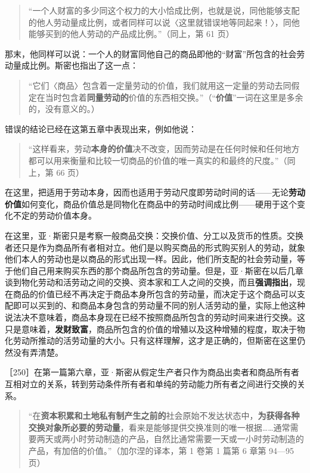\begin{quote}“一个人财富的多少同这个权力的大小恰成比例，也就是说，同他能够支配的他人劳动量成比例，或者同样可以说〈这里就错误地等同起来！〉，同他能够买到的他人劳动的产品成比例。”（同上，第 61 页）\end{quote}

那末，他同样可以说：一个人的财富同他自己的商品即他的“财富”所包含的社会劳动量成比例。斯密也指出了这一点：

\begin{quote}“它们〈商品〉包含着一定量劳动的价值，我们就用这一定量的劳动去同假定在当时包含着\textbf{同量劳动的}价值的东西相交换。”（“\textbf{价值}”一词在这里是多余的，没有意义的。）\end{quote}

错误的结论已经在这第五章中表现出来，例如他说：

\begin{quote}“这样看来，劳动\textbf{本身的价值}决不改变，因而劳动是在任何时候和任何地方都可以用来衡量和比较一切商品的价值的唯一真实的和最终的尺度。”（同上，第 66 页）\end{quote}

在这里，把适用于劳动本身，因而也适用于劳动尺度即劳动时间的话——无论\textbf{劳动价值}如何变化，商品价值总是同物化在商品中的劳动时间成比例——硬用于这个变化不定的劳动价值本身。

在这里，亚·斯密只是考察一般商品交换：交换价值、分工以及货币的性质。交换者还只是作为商品所有者相对立。他们是以购买商品的形式购买别人的劳动，就象他们本人的劳动也是以商品的形式出现一样。因此，他们所支配的社会劳动量，等于他们自己用来购买东西的那个商品所包含的劳动量。但是，亚·斯密在以后几章谈到物化劳动和活劳动之间的交换、资本家和工人之间的交换，而且\textbf{强调指出}，现在商品的价值已经不再决定于商品本身所包含的劳动量，而决定于这个商品可以支配即可以买到的、和商品本身包含的劳动量不同的别人活劳动的量，实际上他这种说法决不意味着，商品本身现在已经不按照商品所包含的劳动时间来进行交换。这只是意味着，\textbf{发财致富}，商品所包含的价值的增殖以及这种增殖的程度，取决于物化劳动所推动的活劳动量的大小。只有这样理解，这才是正确的，但斯密在这里仍然没有弄清楚。


［250］在第一篇第六章，亚·斯密从假定生产者只作为商品出卖者和商品所有者互相对立的关系，转到劳动条件所有者和单纯的劳动能力所有者之间进行交换的关系。

\begin{quote}“在\textbf{资本积累和土地私有制产生之前的}社会原始不发达状态中，\textbf{为获得各种交换对象所必要的劳动量}，看来是能够提供交换准则的唯一根据……通常需要两天或两小时劳动制造的产品，自然比通常需要一天或一小时劳动制造的产品，有加倍的价值。”（加尔涅的译本，第 1 卷第 1 篇第 6 章第 94—95 页）\end{quote}

